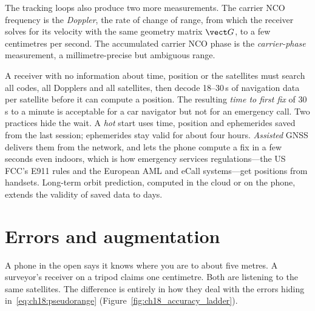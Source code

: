 The tracking loops also produce two more measurements. The carrier NCO frequency is the
\emph{Doppler}, the rate of change of range, from which the receiver solves for its
velocity with the same geometry matrix $\vect G$, to a few centimetres per second. The
accumulated carrier NCO phase is the \emph{carrier-phase} measurement, a millimetre-precise
but ambiguous range.

\begin{pitfall}
A receiver with no information about time, position or the satellites must search all
codes, all Dopplers and all satellites, then decode 18--30\,s of navigation data per satellite
before it can compute a position. The resulting \emph{time to first fix} of 30\,s to a minute
is acceptable for a car navigator but not for an emergency call. Two practices hide the wait.
A \emph{hot} start uses time, position and ephemerides saved from the last session; ephemerides
stay valid for about four hours. \emph{Assisted} GNSS delivers them from the network, and lets
the phone compute a fix in a few seconds even indoors, which is how emergency services
regulations---the US FCC's E911 rules and the European AML and eCall systems---get
positions from handsets. Long-term orbit prediction, computed in the cloud or on the phone,
extends the validity of saved data to days.
\end{pitfall}

\section{Errors and augmentation}
\label{sec:ch18:errors}

A phone in the open says it knows where you are to about five metres. A surveyor's receiver on a
tripod claims one centimetre. Both are listening to the same satellites. The difference is
entirely in how they deal with the errors hiding in~\eqref{eq:ch18:pseudorange}
(Figure~\ref{fig:ch18_accuracy_ladder}).


